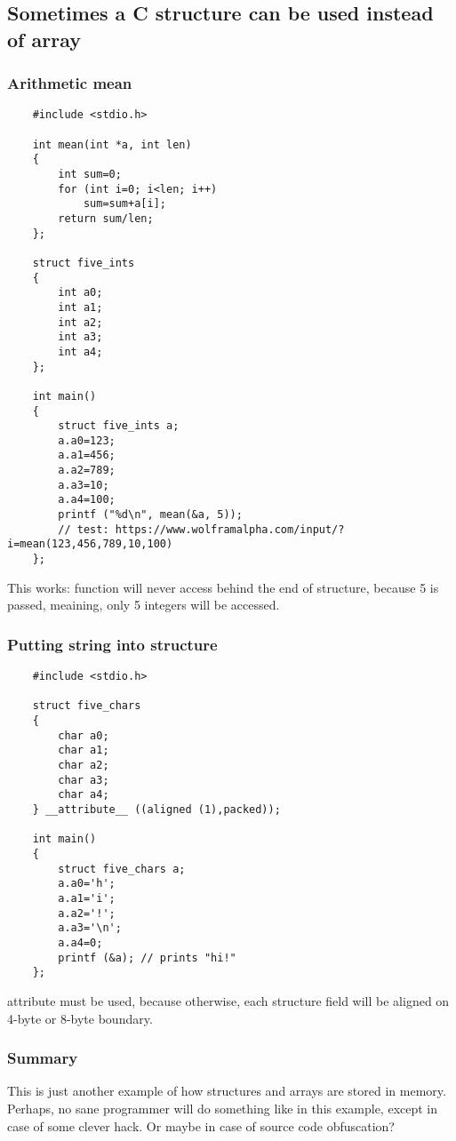 \subsection{Sometimes a C structure can be used instead of array}

\subsubsection{Arithmetic mean}

\begin{lstlisting}
	#include <stdio.h>

	int mean(int *a, int len)
	{
		int sum=0;
		for (int i=0; i<len; i++)
			sum=sum+a[i];
		return sum/len;
	};

	struct five_ints
	{
		int a0;
		int a1;
		int a2;
		int a3;
		int a4;
	};

	int main()
	{
		struct five_ints a;
		a.a0=123;
		a.a1=456;
		a.a2=789;
		a.a3=10;
		a.a4=100;
		printf ("%d\n", mean(&a, 5));
		// test: https://www.wolframalpha.com/input/?i=mean(123,456,789,10,100)
	};
\end{lstlisting}

This works:  function will never access behind the end of  structure,
because 5 is passed, meaining, only 5 integers will be accessed.

\subsubsection{Putting string into structure}

\begin{lstlisting}
	#include <stdio.h>

	struct five_chars
	{
		char a0;
		char a1;
		char a2;
		char a3;
		char a4;
	} __attribute__ ((aligned (1),packed));

	int main()
	{
		struct five_chars a;
		a.a0='h';
		a.a1='i';
		a.a2='!';
		a.a3='\n';
		a.a4=0;
		printf (&a); // prints "hi!"
	};
\end{lstlisting}

 attribute must be used, because otherwise,
each structure field will be aligned on 4-byte or 8-byte boundary.

\subsubsection{Summary}

This is just another example of how structures and arrays are stored in memory.
Perhaps, no sane programmer will do something like in this example, except in case of some clever hack.
Or maybe in case of source code obfuscation?


